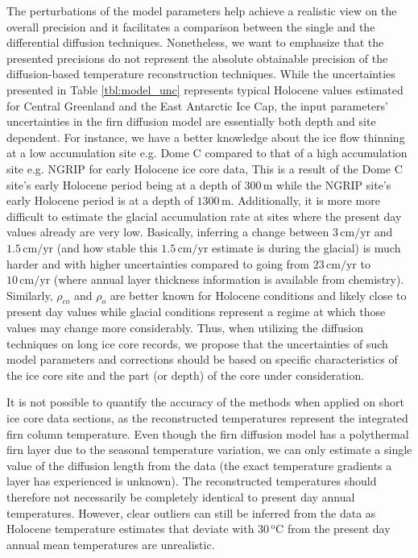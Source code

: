 \documentclass[11pt, draftcls, onecolumn]{IEEEtran} %
\numberwithin{equation}{section}
\numberwithin{table}{section}
\numberwithin{figure}{section}
\begin{document}
The perturbations of the model parameters help achieve a realistic view on the overall precision
and it facilitates a comparison between the single and the differential diffusion techniques.
Nonetheless, we want to emphasize that the presented precisions do not represent the absolute obtainable precision 
of the diffusion-based temperature reconstruction techniques. 
While the uncertainties presented in Table \ref{tbl:model_unc} represents typical Holocene values estimated
for Central Greenland and the East Antarctic Ice Cap, the input parameters' uncertainties in the firn diffusion model 
are essentially both depth and site dependent. 
For instance, we have a better knowledge about the ice flow thinning at a low accumulation site e.g. Dome C 
compared to that of a high accumulation site e.g. NGRIP for early Holocene ice core data,
This is a result of the Dome C site's early Holocene period being at a depth of $300\,\mathrm{m}$ while the NGRIP site's
early Holocene period is at a depth of $1300\,\mathrm{m}$. 
Additionally, it is more more difficult to estimate the glacial accumulation rate at sites where the
present day values already are very low.
Basically, inferring a change 
between $3\,\mathrm{cm/yr}$ and $1.5\,\mathrm{cm/yr}$ (and how stable this $1.5\,\mathrm{cm/yr}$ estimate is during the glacial) 
is much harder and with higher uncertainties compared to going from $23\,\mathrm{cm/yr}$ to $10\,\mathrm{cm/yr}$
(where annual layer thickness information is available from chemistry).
Similarly, $\rho_{co}$ and $\rho_o$ are better known for Holocene conditions and likely close to present day
values while glacial conditions represent a regime at which those values may change more considerably.
Thus, when utilizing the diffusion techniques on long ice core records,
we propose that the uncertainties of such model parameters and corrections should be
based on specific characteristics of the ice core site and the part (or depth) of the core under consideration.


It is not possible to quantify the accuracy of the methods when applied on short ice core data sections,
as the reconstructed temperatures represent the integrated firn column temperature.
Even though the firn diffusion model has a polythermal firn layer due to the seasonal temperature variation,
we can only estimate a single value of the diffusion length from the data
(the exact temperature gradients a layer has experienced is unknown).
The reconstructed temperatures should therefore not necessarily be completely identical to present day annual temperatures.
However, clear outliers can still be inferred from the data as Holocene temperature estimates that deviate with
$30\,^\mathrm{o}\mathrm{C}$ from the present day annual mean temperatures are unrealistic.
\end{document}
